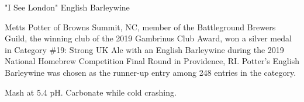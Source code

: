 \stylesection{\styleenglishbarleywine}

\begin{recipie}{"I See London" English Barleywine}

\begin{aboutblock}
Metts Potter of Browns Summit, NC, member of the Battleground Brewers Guild,
the winning club of the 2019 Gambrinus Club Award, won a silver medal in
Category \#19: Strong UK Ale with an English Barleywine during the 2019 National
Homebrew Competition Final Round in Providence, RI. Potter's English Barleywine
was chosen as the runner-up entry among 248 entries in the category. \sourceaha
\end{aboutblock}


\begin{methodandtiming}
 
\begin{mashsteps}
\end{mashsteps}

\begin{fermentationsteps}
\end{fermentationsteps}

\begin{directions}
Mash at 5.4 pH. Carbonate while cold crashing.
\end{directions}

\end{methodandtiming}

\pagebreak

\begin{ingredientsblock}

\begin{malts}
\end{malts}

\begin{hops}
\end{hops}


\end{ingredientsblock}

\end{recipie}
